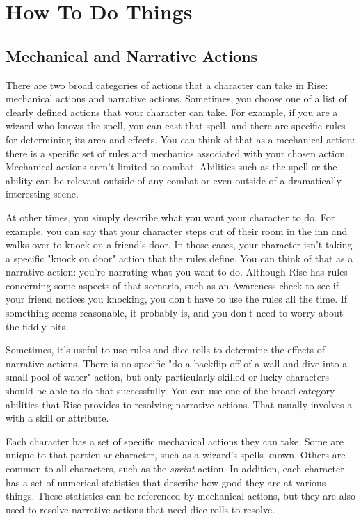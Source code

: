 \section{How To Do Things}

    \subsection{Mechanical and Narrative Actions}
        There are two broad categories of actions that a character can take in Rise: mechanical actions and narrative actions.
        Sometimes, you choose one of a list of clearly defined actions that your character can take.
        For example, if you are a wizard who knows the  spell, you can cast that spell, and there are specific rules for determining its area and effects.
        You can think of that as a mechanical action: there is a specific set of rules and mechanics associated with your chosen action.
        Mechanical actions aren't limited to combat.
        Abilities such as the  spell or the  ability can be relevant outside of any combat or even outside of a dramatically interesting scene.

        At other times, you simply describe what you want your character to do.
        For example, you can say that your character steps out of their room in the inn and walks over to knock on a friend's door.
        In those cases, your character isn't taking a specific "knock on door" action that the rules define.
        You can think of that as a narrative action: you're narrating what you want to do.
        Although Rise has rules concerning some aspects of that scenario, such as an Awareness check to see if your friend notices you knocking, you don't have to use the rules all the time.
        If something seems reasonable, it probably is, and you don't need to worry about the fiddly bits.

        Sometimes, it's useful to use rules and dice rolls to determine the effects of narrative actions.
        There is no specific "do a backflip off of a wall and dive into a small pool of water" action, but only particularly skilled or lucky characters should be able to do that successfully.
        You can use one of the broad category abilities that Rise provides to resolving narrative actions.
        That usually involves a  with a skill or attribute.

        Each character has a set of specific mechanical actions they can take.
        Some are unique to that particular character, such as a wizard's spells known.
        Others are common to all characters, such as the \textit{sprint} action.
        In addition, each character has a set of numerical statistics that describe how good they are at various things.
        These statistics can be referenced by mechanical actions, but they are also used to resolve narrative actions that need dice rolls to resolve.


